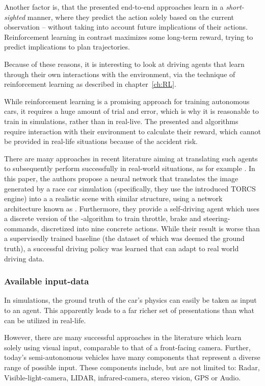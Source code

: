 Another factor is, that the presented end-to-end approaches learn in a \textit{short-sighted} manner, where they predict the action solely based on the current observation -- without taking into account future implications of their actions. Reinforcement learning in contrast maximizes some long-term reward, trying to predict implications to plan trajectories.

Because of these reasons, it is interesting to look at driving agents that learn through their own interactions with the environment, via the technique of reinforcement learning as described in chapter~\ref{ch:RL}.

While reinforcement learning is a promising approach for training autonomous cars, it requires a huge amount of trial and error, which is why it is reasonable to train in simulations, rather than in real-live. The presented  and  algorithms require interaction with their environment to calculate their reward, which cannot be provided in real-life situations because of the accident risk.

There are many approaches in recent literature aiming at translating such agents to subsequently perform successfully in real-world situations, as for example \cite{you_virtual_2017}. In this paper, the authors propose a neural network that translates the image generated by a race car simulation (specifically, they use the introduced TORCS engine) into a a realistic scene with similar structure, using a network architecture known as \cite{badrinarayanan_segnet:_2015}. 
Furthermore, they provide a self-driving agent which uses a discrete version of the  \cite{mnih_asynchronous_2016}-algorithm to train throttle, brake and steering-commands, discretized into nine concrete actions. While their result is worse than a supervisedly trained baseline (the dataset of which was deemed the ground truth), a successful driving policy was learned that can adapt to real world driving data.

\subsubsection{Available input-data}

In simulations, the ground truth of the car's physics can easily be taken as input to an agent. This apparently leads to a far richer set of presentations than what can be utilized in real-life. 

However, there are many successful approaches in the literature which learn solely using visual input, comparable to that of a front-facing camera. Further, today's semi-autonomous vehicles have many components that represent a diverse range of possible input. These components include, but are not limited to: Radar, Visible-light-camera, LIDAR, infrared-camera, stereo vision, GPS or Audio. 

